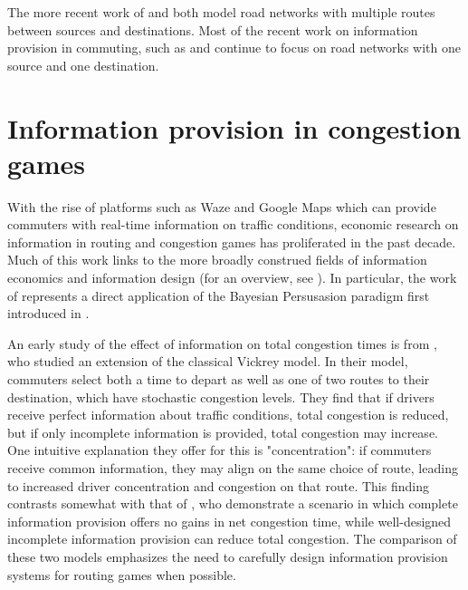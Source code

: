 \documentclass[JEL]{AEA}
\begin{document}
The more recent work of \cite{das-2017} and \cite{ostrovsky-2018} both model road networks with multiple routes between sources and destinations. Most of the recent work on information provision in commuting, such as \cite{das-2017} and \cite{acemoglu-2016} continue to focus on road networks with one source and one destination.

\section{Information provision in congestion games}
\label{information-provision}

With the rise of platforms such as Waze and Google Maps which can provide commuters with real-time information on traffic conditions, economic research on information in routing and congestion games has proliferated in the past decade. Much of this work links to the more broadly construed fields of information economics and information design (for an overview, see \cite{bergemann-2019}). In particular, the work of \cite{das-2017} represents a direct application of the Bayesian Persusasion paradigm first introduced in \cite{kamenica-2011}.

An early study of the effect of information on total congestion times is from \cite{arnott-1991}, who studied an extension of the classical Vickrey model. In their model, commuters select both a time to depart as well as one of two routes to their destination, which have stochastic congestion levels. They find that if drivers receive perfect information about traffic conditions, total congestion is reduced, but if only incomplete information is provided, total congestion may increase. One intuitive explanation they offer for this is "concentration": if commuters receive common information, they may align on the same choice of route, leading to increased driver concentration and congestion on that route. This finding contrasts somewhat with that of \cite{das-2017}, who demonstrate a scenario in which complete information provision offers no gains in net congestion time, while well-designed incomplete information provision can reduce total congestion. The comparison of these two models emphasizes the need to carefully design information provision systems for routing games when possible.

\end{document}
